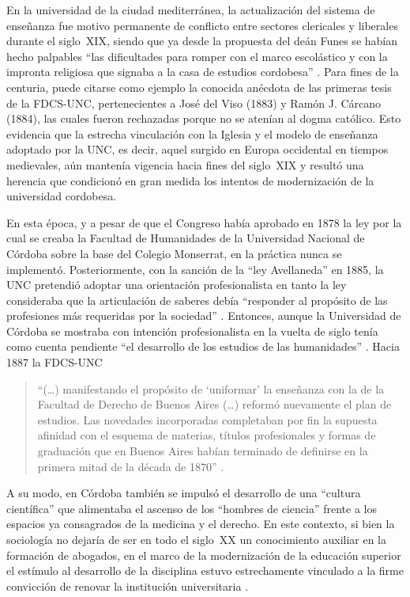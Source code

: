 En la universidad de la ciudad mediterránea, la actualización del sistema de enseñanza fue motivo permanente de conflicto entre sectores clericales y liberales durante el siglo~XIX, siendo que ya desde la propuesta del deán Funes se habían hecho palpables \enquote{las dificultades para romper con el marco escolástico y con la impronta religiosa que signaba a la casa de estudios cordobesa} \parencite[21]{1536-BUCHBINDER2010}. Para fines de la centuria, puede citarse como ejemplo la conocida anécdota de las primeras tesis de la FDCS-UNC, pertenecientes a José del Viso (1883) y Ramón J. Cárcano (1884), las cuales fueron rechazadas porque no se atenían al dogma católico. Esto evidencia que la estrecha vinculación con la Iglesia y el modelo de enseñanza adoptado por la UNC, es decir, aquel surgido en Europa occidental en tiempos medievales, aún mantenía vigencia hacia fines del siglo~XIX y resultó una herencia que condicionó en gran medida los intentos de modernización de la universidad cordobesa.

En esta época, y a pesar de que el Congreso había aprobado en 1878 la ley por la cual se creaba la Facultad de Humanidades de la Universidad Nacional de Córdoba sobre la base del Colegio Monserrat, en la práctica nunca se implementó. Posteriormente, con la sanción de la \enquote{ley Avellaneda} en 1885, la UNC pretendió adoptar una orientación profesionalista en tanto la ley consideraba que la articulación de saberes debía \enquote{responder al propósito de las profesiones más requeridas por la sociedad} \parencite[26]{1561-CHAVES2013}. Entonces, aunque la Universidad de Córdoba se mostraba con intención profesionalista en la vuelta de siglo tenía como cuenta pendiente \enquote{el desarrollo de los estudios de las humanidades} \parencite[28]{1561-CHAVES2013}. Hacia 1887 la FDCS-UNC

\begin{quote}
\enquote{(\dots) manifestando el propósito de \enquote{uniformar} la enseñanza con la de la Facultad de Derecho de Buenos Aires (\dots) reformó nuevamente el plan de estudios. Las novedades incorporadas  completaban por fin la supuesta afinidad con el esquema de materias, títulos profesionales y formas de graduación que en Buenos Aires habían terminado de definirse en la primera mitad de la década de 1870} \parencite[49]{1560-CHAVES2013}.
\end{quote}

A su modo, en Córdoba también se impulsó el desarrollo de una \enquote{cultura científica} \parencite{1506-TERAN2008} que alimentaba el ascenso de los \enquote{hombres de ciencia} frente a los espacios ya consagrados de la medicina y el derecho. En este contexto, si bien la sociología no dejaría de ser en todo el siglo~XX un conocimiento auxiliar en la formación de abogados, en el marco de la modernización de la educación superior el estímulo al desarrollo de la disciplina estuvo estrechamente vinculado a la firme convicción de renovar la institución universitaria \parencite{1673-GRISENDI2010}.

